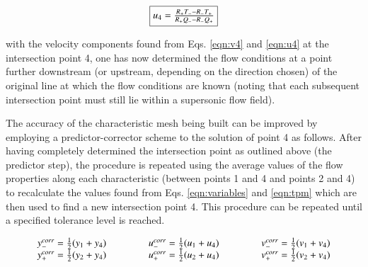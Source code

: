\begin{equation}
	\fbox{$
	u_4 = \frac{R_+T_- - R_-T_+}{R_+Q_- -  R_-Q_+}
	$}
\label{eqn:u4}
\end{equation}

	with the velocity components found from Eqs. \ref{eqn:v4} and \ref{eqn:u4} at
the intersection point 4, one has now determined the flow conditions at a
point further downstream (or upstream, depending on the direction chosen) of the original
line at which the flow conditions are known (noting that each subsequent intersection point
must still lie within a supersonic flow field).  

	The accuracy of the characteristic mesh being 
built can be improved by employing a predictor-corrector scheme to the solution of point 4
as follows.  After having completely determined the intersection point as outlined above (the predictor step), 
the procedure is repeated using the average values of the flow properties along each characteristic
(between points 1 and 4 and points 2 and 4) to recalculate the values found from Eqs. \ref{eqn:variables} 
and \ref{eqn:tpm} which are then used to find a new intersection point 4.  This procedure can be repeated until a 
specified tolerance level is reached.

\begin{equation}
	\begin{array}{c}
	y_-^{corr}= \frac{1}{2}(y_1 + y_4) \hspace{1.5cm} u_-^{corr} = \frac{1}{2}(u_1 + u_4)
	\hspace{1.5cm} v_-^{corr} = \frac{1}{2}(v_1 + v_4) \\
	y_+^{corr}= \frac{1}{2}(y_2 + y_4) \hspace{1.5cm} u_+^{corr} = \frac{1}{2}(u_2 + u_4)
	\hspace{1.5cm} v_+^{corr} = \frac{1}{2}(v_2 + v_4)
	\end{array}
\label{eqn:corrector}
\end{equation} 

